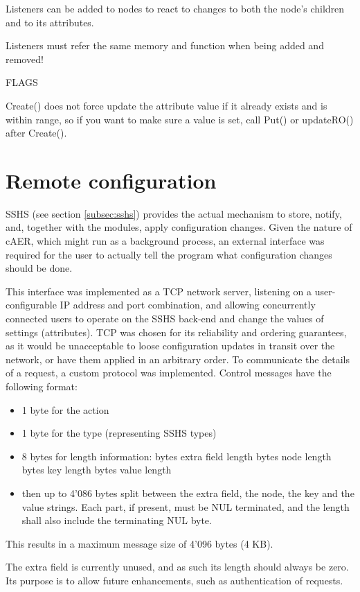 \documentclass[a4paper,12pt]{report}
\begin{document}
Listeners can be added to nodes to react to changes to both the node's children and to its attributes.

Listeners must refer the same memory and function when being added and removed!

FLAGS

Create() does not force update the attribute value if it already exists and is within range,
so if you want to make sure a value is set, call Put() or updateRO() after Create().

\section{Remote configuration} \label{subsec:remote_configuration}

SSHS (see section \ref{subsec:sshs}) provides the actual mechanism to store, notify, and, together with the modules, apply configuration changes. Given the nature of cAER, which might run as a background process, an external interface was required for the user to actually tell the program what configuration changes should be done.

This interface was implemented as a TCP network server, listening on a user-configurable IP address and port combination, and allowing concurrently connected users to operate on the SSHS back-end and change the values of settings (attributes).
TCP was chosen for its reliability and ordering guarantees, as it would be unacceptable to loose configuration updates in transit over the network, or have them applied in an arbitrary order.
\clearpage
To communicate the details of a request, a custom protocol was implemented.
Control messages have the following format:
\begin{itemize}
\item 1 byte for the action
\item 1 byte for the type (representing SSHS types)
\item 8 bytes for length information:
 bytes extra field length
 bytes node length
 bytes key length
 bytes value length
\item then up to 4'086 bytes split between the extra field, the node, the key and the value strings. Each part, if present, must be NUL terminated, and the length shall also include the terminating NUL byte.
\end{itemize}
This results in a maximum message size of 4'096 bytes (4 KB).

The extra field is currently unused, and as such its length should always be zero. Its purpose is to allow future enhancements, such as authentication of requests.
\end{document}
